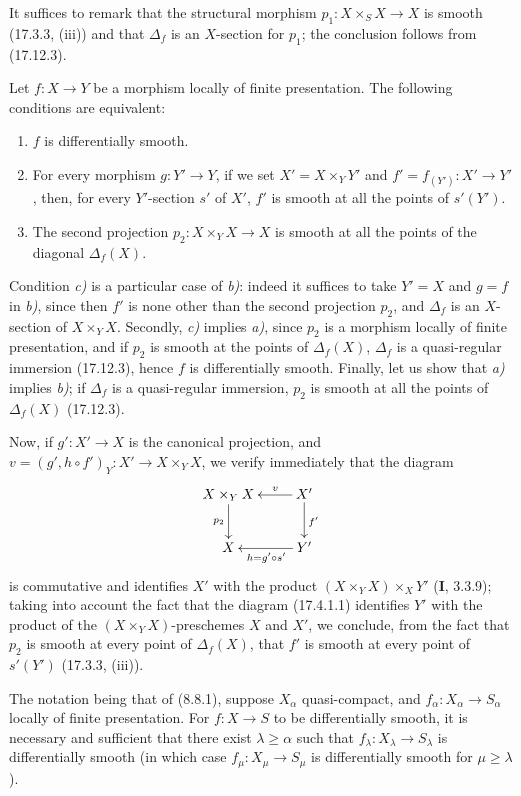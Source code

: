 It suffices to remark that the structural morphism $p_1:X\times_SX\to X$ is smooth (17.3.3, (iii)) and that $\Delta_f$ is an $X$-section for $p_1$; the conclusion follows from (17.12.3).

\begin{proposition}[17.12.5]
\label{IV.17.12.5}
Let $f:X\to Y$ be a morphism locally of finite presentation. The following conditions are equivalent:
\begin{enumerate}
  \item[\textup{a)}] $f$ is differentially smooth.
  \item[\textup{b)}] For every morphism $g:Y'\to Y$, if we set $X'=X\times_Y Y'$ and $f'=f_{(Y')}:X'\to Y'$, then, for every $Y'$-section $s'$ of $X'$, $f'$ is smooth at all the points of $s'(Y')$.
  \item[\textup{c)}] The second projection $p_2:X\times_YX\to X$ is smooth at all the points of the diagonal $\Delta_f(X)$.
\end{enumerate}
\end{proposition}


Condition \emph{c)} is a particular case of \emph{b)}: indeed it suffices to take $Y'=X$ and $g=f$ in \emph{b)}, since then $f'$ is none other than the second projection $p_2$, and $\Delta_f$ is an $X$-section of $X\times_YX$. Secondly, \emph{c)} implies \emph{a)}, since $p_2$ is a morphism locally of finite presentation, and if $p_2$ is smooth at the points of $\Delta_f(X)$, $\Delta_f$ is a quasi-regular immersion (17.12.3), hence $f$ is differentially smooth. Finally, let us show that \emph{a)} implies \emph{b)}; if $\Delta_f$ is a quasi-regular immersion, $p_2$ is smooth at all the points of $\Delta_f(X)$ (17.12.3).

Now, if $g':X'\to X$ is the canonical projection, and $v=(g',h\circ f')_Y:X'\to X\times_YX$, we verify immediately that the diagram
\[
\xymatrix{
  X\times_Y X \ar[d]_{p_2} & X' \ar[l]_-v \ar[d]^{f'}\\
  X & Y' \ar[l]^{h=g'\circ s'}
}
\]
is commutative and identifies $X'$ with the product $(X\times_YX)\times_XY'$ (\textbf{I}, 3.3.9); taking into account the fact that the diagram (17.4.1.1) identifies $Y'$ with the product of the $(X\times_YX)$-preschemes $X$ and $X'$, we conclude, from the fact that $p_2$ is smooth at every point of $\Delta_f(X)$, that $f'$ is smooth at every point of $s'(Y')$ (17.3.3, (iii)).

\begin{corollary}[17.12.6]
\label{IV.17.12.6}
The notation being that of \textup{(8.8.1)}, suppose $X_\alpha$ quasi-compact, and $f_\alpha:X_\alpha\to S_\alpha$ locally of finite presentation. For $f:X\to S$ to be differentially smooth, it is necessary and sufficient that there exist $\lambda\geq\alpha$ such that $f_\lambda:X_\lambda\to S_\lambda$ is differentially smooth \textup{(}in which case $f_\mu:X_\mu\to S_\mu$ is differentially smooth for $\mu\geq\lambda$\textup{)}.
\end{corollary}

